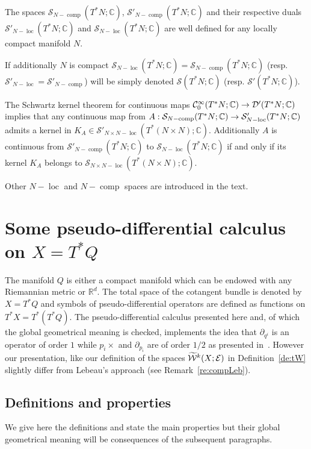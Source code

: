 \documentclass[AHL,Unicode,longabstracts]{cedram}
\newcommand{\C}{\mathbb{C}}
\newcommand{\R}{\mathbb{R}}
\newcommand{\clW}{\mathcal{W}}
\newcommand{\clC}{\mathcal{C}}
\newcommand{\clE}{\mathcal{E}}
\newcommand{\clS}{\mathcal{S}}
\newcommand{\clD}{\mathcal{D}}
\DeclareMathOperator{\ccomp}{comp}
\DeclareMathOperator{\locc}{loc}
\let\oldtilde\tilde
\renewcommand*{\tilde}[1]{\mathchoice{\widetilde{#1}}{\widetilde{#1}}{\oldtilde{#1}}{\oldtilde{#1}}}
\renewcommand*{\to}{\mathchoice{\longrightarrow}{\rightarrow}{\rightarrow}{\rightarrow}}
\begin{document}
\begin{exam}
The spaces $\clS_{N-\ccomp}(T^{*}N;\C)$, $\clS'_{N-\ccomp}(T^{*}N;\C)$ and their respective duals $\clS'_{N-\locc}(T^{*}N;\C)$ and $\clS_{N-\locc}(T^{*}N;\C)$ are well defined for any locally compact manifold $N$.

If additionally $N$ is compact $\clS_{N-\locc}(T^{*}N;\C)=\clS_{N-\ccomp}(T^{*}N;\C)$ (resp. $\clS'_{N-\locc}=\clS'_{N-\ccomp}$) will be simply denoted $\clS(T^{*}N;\C)$ (resp. $\clS'(T^{*}N;\C)$).

The Schwartz kernel theorem for continuous maps $\clC^{\infty}_{0}(T^{*}N;\C)\to \clD'(T^{*}N;\C)$ implies that any continuous map from $A:\clS_{N-\ccomp}(T^{*}N;\C)\to \clS'_{N-\locc}(T^{*}N;\C)$ admits a kernel in $K_{A}\in \clS'_{N\times N-\locc}(T^{*}(N\times N);\C)$. Additionally $A$ is continuous from $\clS'_{N-\ccomp}(T^{*}N;\C)$ to $\clS_{N-\locc}(T^{*}N;\C)$ if and only if its kernel $K_{A}$ belongs to $\clS_{N\times N-\locc}(T^{*}(N\times N);\C)$.
\end{exam}

Other $N-\locc$ and $N-\ccomp$ spaces are introduced in the text.


\section{Some pseudo-differential calculus on \texorpdfstring{$X=T^{*}Q$}{X=T\^*Q}}\label{sec:pseudodiff}
The manifold $Q$ is either a compact manifold which can be endowed with any Riemannian metric or $\R^{d}$. The total space of the cotangent bundle is denoted by $X=T^{*}Q$ and symbols of pseudo-differential operators are defined as functions on $T^{*}X=T^{*}(T^{*}Q)$.
The pseudo-differential calculus presented here and, of which the global geometrical meaning is checked, implements the idea that $\partial_{q^{i}}$ is an operator of order $1$ while $p_{i}\times$ and $\partial_{p_{i}}$ are of order $1/2$ as presented in~\cite{Leb1,Leb2}. However our presentation, like our definition of the spaces $\tilde{\clW}^{k}(X;\clE)$ in Definition~\ref{de:tW} slightly differ from Lebeau's approach (see Remark~\ref{re:compLeb}).

\subsection{Definitions and properties}\label{sec:defpseudo}

We give here the definitions and state the main properties but their global geometrical meaning will be consequences of the subsequent paragraphs.
\end{document}
